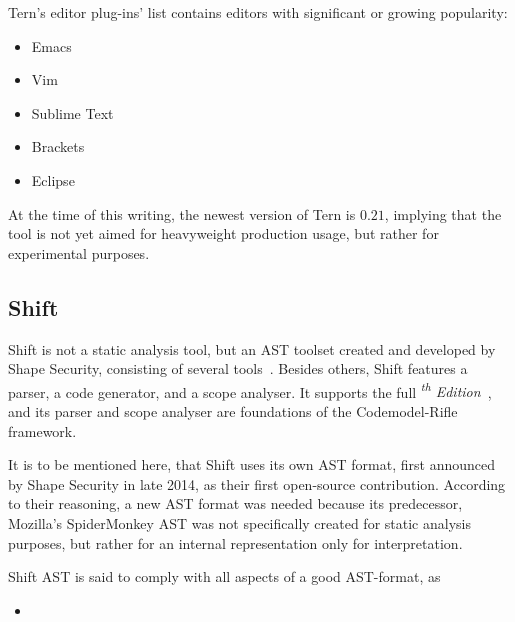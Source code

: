 Tern's editor plug-ins' list contains editors with significant or growing popularity:

\begin{itemize}
\item Emacs
\item Vim
\item Sublime Text
\item Brackets
\item Eclipse
\end{itemize}

At the time of this writing, the newest version of Tern is $0.21$, implying that the tool is not yet aimed for heavyweight production usage, but rather for experimental purposes.


\subsection{Shift}

Shift is not a static analysis tool, but an AST toolset created and developed by Shape Security, consisting of several tools~\cite{shift-ast}. Besides others, Shift features a parser, a code generator, and a scope analyser. It supports the full \emph{\textsuperscript{th} Edition}~\cite{shift-ast}, and its parser and scope analyser are foundations of the Codemodel-Rifle framework.

It is to be mentioned here, that Shift uses its own AST format, first announced by Shape Security in late 2014, as their first open-source contribution. According to their reasoning, a new \es AST format was needed because its predecessor, Mozilla's SpiderMonkey AST was not specifically created for static analysis purposes, but rather for an internal representation only for interpretation.

Shift AST is said to comply with all aspects of a good AST-format, as

\begin{itemize}
\item {}~\cite{shift-ast-comparison}
\end{itemize}

